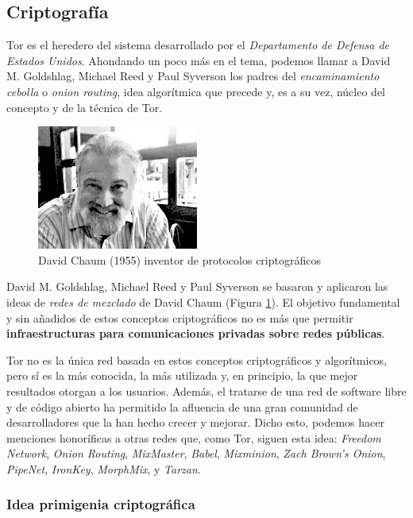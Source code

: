 \documentclass[a4paper, 11pt, titlepage]{article}
\begin{document}
    \subsection{Criptografía}

        Tor es el heredero del sistema desarrollado por el \emph{Departamento de Defensa de Estados Unidos}. Ahondando 
        un poco más en el tema, podemos llamar a David M. Goldshlag, Michael Reed y Paul Syverson los padres del 
        \emph{encaminamiento cebolla} o \emph{onion routing}, idea algorítmica que precede y, es a su vez, núcleo del 
        concepto y de la técnica de Tor.

        \begin{figure}[htp]
            \centering
            \includegraphics[scale=1.00]{resources/davidchaum.jpg}
            \caption{David Chaum (1955) inventor de protocolos criptográficos}
            \label{chaum}
        \end{figure}

        David M. Goldshlag, Michael Reed y Paul Syverson se basaron y aplicaron las ideas de \emph{redes de mezclado} 
        de David Chaum (Figura \ref{chaum}). El objetivo fundamental y sin añadidos de estos conceptos criptográficos 
        no es más que permitir \textbf{infraestructuras para comunicaciones privadas sobre redes públicas}.

        Tor no es la única red basada en estos conceptos criptográficos y algorítmicos, pero sí es la más conocida, la 
        más utilizada y, en principio, la que mejor resultados otorgan a los usuarios. Además, el tratarse de una red 
        de software libre y de código abierto ha permitido la afluencia de una gran comunidad de desarrolladores que 
        la han hecho crecer y mejorar. Dicho esto, podemos hacer menciones honoríficas a otras redes que, como Tor, 
        siguen esta idea: \emph{Freedom Network}, \emph{Onion Routing}, \emph{MixMaster}, \emph{Babel}, \emph{Mixminion}, 
        \emph{Zach Brown's Onion}, \emph{PipeNet}, \emph{IronKey}, \emph{MorphMix}, y \emph{Tarzan}.

        \subsubsection{Idea primigenia criptográfica}
\end{document}
